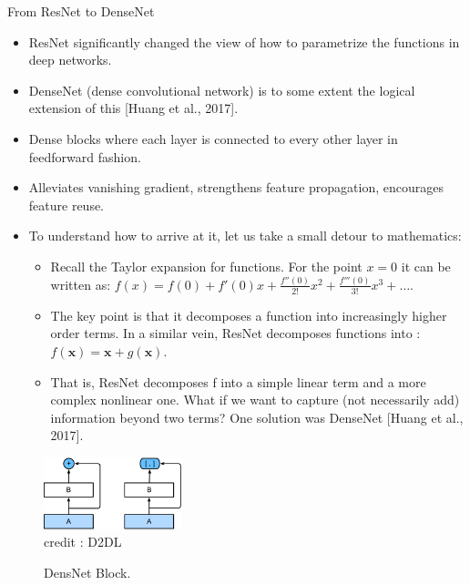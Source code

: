 \begin{vbframe}{From ResNet to DenseNet}
    \begin{itemize}
        \item ResNet significantly changed the view of how to parametrize the functions in deep networks. 
        \item DenseNet (dense convolutional network) is to some extent the logical extension of this [Huang et al., 2017]. 
        \item Dense blocks where each layer is connected to every other layer in feedforward fashion.
        \item Alleviates vanishing gradient, strengthens feature propagation, encourages feature reuse.
        \item To understand how to arrive at it, let us take a small detour to mathematics: 
        \begin{itemize}
             \item Recall the Taylor expansion for functions. For the point  $x=0$  it can be written as: $f(x) = f(0) + f'(0) x + \frac{f''(0)}{2!}  x^2 + \frac{f'''(0)}{3!}  x^3 + \ldots.$
             \item The key point is that it decomposes a function into increasingly higher order terms. In a similar vein, ResNet decomposes functions into : $f(\mathbf{x}) = \mathbf{x} + g(\mathbf{x}).$
             \item That is, ResNet decomposes  f  into a simple linear term and a more complex nonlinear one. What if we want to capture (not necessarily add) information beyond two terms? One solution was DenseNet [Huang et al., 2017].
        \end{itemize}
    \end{itemize}
    
     \begin{figure}
  \centering
    \includegraphics[width=4cm]{plots/moderncnn/densenet-block.png}
    \tiny{\\ credit : D2DL}
    \caption{ DensNet Block.}
  \end{figure}
  

\end{vbframe}
